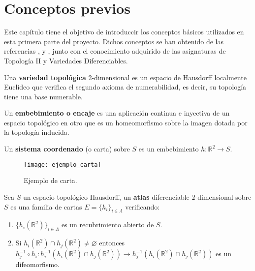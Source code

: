 
\chapter{Conceptos previos}

Este capítulo tiene el objetivo de introduccir los conceptos básicos utilizados en esta primera parte del proyecto. Dichos conceptos se han obtenido de las referencias \cite{MorseTh1}, \cite{MorseTh2} y \cite{Triangulacion}, junto con el conocimiento adquirido de las asignaturas de Topología II y Variedades Diferenciables.

\begin{definicion} Una \textbf{variedad topológica} 2-dimensional es un espacio de Hausdorff localmente Euclídeo que verifica el segundo axioma de numerabilidad, es decir, su topología tiene una base numerable.
\end{definicion}

\begin{definicion} Un \textbf{embebimiento o encaje} es una aplicación continua e inyectiva de un espacio topológico en otro que es un homeomorfismo sobre la imagen dotada por la topología inducida.
\end{definicion}

\begin{definicion} Un \textbf{sistema coordenado} (o carta) sobre $S$ es un embebimiento $h : \mathbb{R}^2 \rightarrow S$.
\end{definicion}

\begin{figure}[h]
  	\centering
  	\texttt{[image: ejemplo\_carta]}
	\caption{Ejemplo de carta.}
  	\label{fig:ejemplo_carta}
\end{figure}

\begin{definicion} Sea $S$ un espacio topológico Hausdorff, un \textbf{atlas} diferenciable $2$-dimensional sobre $S$ es una familia de cartas $E=\{h_i\}_{i\in \Lambda}$ verificando:
	\begin{enumerate}
		\item $\{h_i(\mathbb{R}^2)\}_{i\in \Lambda}$ es un recubrimiento abierto de $S$.
		\item Si $h_i(\mathbb{R}^2) \cap h_j(\mathbb{R}^2) \neq \varnothing$ entonces $h_j^{-1} \circ h_i:h_i^{-1}(h_i(\mathbb{R}^2)\cap h_j(\mathbb{R}^2)) \rightarrow h_j^{-1}(h_i(\mathbb{R}^2)\cap h_j(\mathbb{R}^2))$ es un difeomorfismo.
	\end{enumerate}
\end{definicion}

